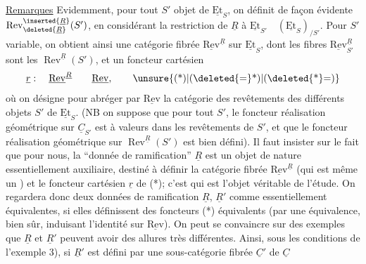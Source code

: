 \uline{Remarques} Evidemment, pour tout $S'$ objet de $\underline{\mathrm{Et}}_S$, on définit de façon évidente $\operatorname{Rev}_{\deleted{\underline{R}}}^{\inserted{\underline{R}}}(S')$, en considérant la restriction de $\underline{R}$ à $\underline{\mathrm{Et}}_{S'}\quad(\underline{\mathrm{Et}}_S)_{/S'}$. Pour $S'$ variable, on obtient ainsi une catégorie fibrée $\underline{\mathrm{Rev}}^{\underline{R}}$ sur $\underline{\mathrm{Et}}_S$, dont les fibres $\underline{\mathrm{Rev}}_{S'}^{\underline{R}}$ sont les $\operatorname{Rev}^{\underline{R}}(S')$, et un foncteur cartésien
\[
\underline{r}:\quad\underline{\mathrm{Rev}}^{\underline{R}}\qquad\underline{\mathrm{Rev}},
\tag*{\unsure{(*)|(\deleted{=}*)|(\deleted{*}=)}}
\]
où on désigne pour abréger par $\underline{\mathrm{Rev}}$ la catégorie  des revêtements des différents objets $S'$ de $\underline{\mathrm{Et}}_S$. (NB on suppose que pour tout $S'$, le foncteur réalisation géométrique sur $\underline{C}_{S'}$ est à valeurs dans les revêtements de $S'$, et que le foncteur réalisation géométrique sur $\operatorname{Rev}^{\underline{R}}(S')$ est bien défini). Il faut insister sur le fait que pour nous, la ``donnée de ramification'' $\underline{R}$ est un objet de nature essentiellement auxiliaire, destiné à définir la catégorie fibrée $\underline{\mathrm{Rev}}^{\underline{R}}$ (qui est même un \uline{}) et le foncteur cartésien $\underline{r}$ de (*); c'est \unsure{(*)|(\deleted{=}*)|(\deleted{*}=)} qui est l'objet véritable de l'étude. On regardera donc deux données de ramification $\underline{R}$, $\underline{R}'$ comme essentiellement équivalentes, si elles définissent des foncteurs (*) équivalents (par une équivalence, bien sûr, induisant l'identité sur $\underline{\mathrm{Rev}}$). On peut se convaincre sur des exemples que $\underline{R}$ et $\underline{R}'$ peuvent avoir des allures très différentes. Ainsi, sous les conditions de l'exemple 3), si $\underline{R}'$ est défini par une sous-catégorie fibrée  $\underline{C}'$ de $\underline{C}$

